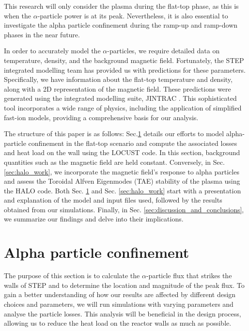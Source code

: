 \documentclass[10pt, a4paper, twoside]{article}
\begin{document}
This research will only consider the plasma during the flat-top phase, as this is when the $\alpha$-particle power is at its peak. Nevertheless, it is also essential to investigate the alpha particle confinement during the ramp-up and ramp-down phases in the near future.

In order to accurately model the $\alpha$-particles, we require detailed data on temperature, density, and the background magnetic field. Fortunately, the STEP integrated modelling team has provided us with predictions for these parameters. Specifically, we have information about the flat-top temperature and density, along with a 2D representation of the magnetic field. These predictions were generated using the integrated modelling suite, JINTRAC \cite{meyer2023, mitchell2023}. This sophisticated tool incorporates a wide range of physics, including the application of simplified fast-ion models, providing a comprehensive basis for our analysis.

The structure of this paper is as follows: Sec.\ref{sec:locust_work} details our efforts to model alpha-particle confinement in the flat-top scenario and compute the associated losses and heat load on the wall using the LOCUST code. In this section, background quantities such as the magnetic field are held constant. Conversely, in Sec. \ref{sec:halo_work}, we incorporate the magnetic field's response to alpha particles and assess the Toroidal Alfven Eigenmodes (TAE) stability of the plasma using the HALO code. Both Sec. \ref{sec:locust_work} and Sec. \ref{sec:halo_work} start with a presentation and explanation of the model and input files used, followed by the results obtained from our simulations. Finally, in Sec. \ref{sec:discussion_and_conclusions}, we summarize our findings and delve into their implications.

\section{Alpha particle confinement}
\label{sec:locust_work}

The purpose of this section is to calculate the $\alpha$-particle flux that strikes the walls of STEP and to determine the location and magnitude of the peak flux. To gain a better understanding of how our results are affected by different design choices and parameters, we will run simulations with varying parameters and analyse the particle losses. This analysis will be beneficial in the design process, allowing us to reduce the heat load on the reactor walls as much as possible.
\end{document}
